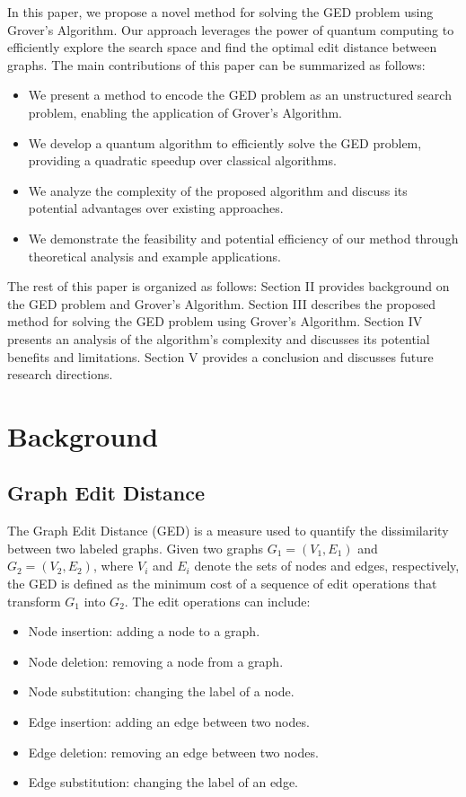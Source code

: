 In this paper, we propose a novel method for solving the GED problem using Grover's Algorithm. Our approach leverages the power of quantum computing to efficiently explore the search space and find the optimal edit distance between graphs. The main contributions of this paper can be summarized as follows:

\begin{itemize}
    \item We present a method to encode the GED problem as an unstructured search problem, enabling the application of Grover's Algorithm.
    \item We develop a quantum algorithm to efficiently solve the GED problem, providing a quadratic speedup over classical algorithms.
    \item We analyze the complexity of the proposed algorithm and discuss its potential advantages over existing approaches.
    \item We demonstrate the feasibility and potential efficiency of our method through theoretical analysis and example applications.
\end{itemize}

The rest of this paper is organized as follows: Section II provides background on the GED problem and Grover's Algorithm. Section III describes the proposed method for solving the GED problem using Grover's Algorithm. Section IV presents an analysis of the algorithm's complexity and discusses its potential benefits and limitations. Section V provides a conclusion and discusses future research directions.

\section{Background}

\subsection{Graph Edit Distance}

The Graph Edit Distance (GED) is a measure used to quantify the dissimilarity between two labeled graphs. Given two graphs $G_1 = (V_1, E_1)$ and $G_2 = (V_2, E_2)$, where $V_i$ and $E_i$ denote the sets of nodes and edges, respectively, the GED is defined as the minimum cost of a sequence of edit operations that transform $G_1$ into $G_2$. The edit operations can include:

\begin{itemize}
    \item Node insertion: adding a node to a graph.
    \item Node deletion: removing a node from a graph.
    \item Node substitution: changing the label of a node.
    \item Edge insertion: adding an edge between two nodes.
    \item Edge deletion: removing an edge between two nodes.
    \item Edge substitution: changing the label of an edge.
\end{itemize}

